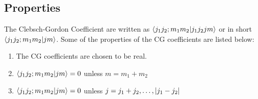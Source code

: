 \subsection{Properties}
The Clebsch-Gordon Coefficient are written as $\braket{j_1 j_2; m_1 m_2}{j_1 j_2 j m}$ or in short $\braket{j_1 j_2; m_1 m_2}{j m}$. Some of the properties of the CG coefficients are listed below:
\begin{enumerate}
	\item The CG coefficients are chosen to be real.
	
	\item $\braket{j_1 j_2; m_1 m_2}{j m} = 0$ unless $m=m_1 + m_2$
	
	\item $\braket{j_1 j_2; m_1 m_2}{j m} = 0$ unless $j=j_1 + j_2, \ldots, \abs{j_1 - j_2}$
	

\end{enumerate}
